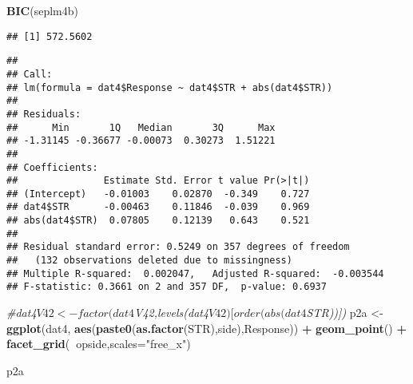 \documentclass[
]{article}
\newenvironment{Shaded}{\begin{snugshade}}{\end{snugshade}}
\newcommand{\CommentTok}[1]{\textcolor[rgb]{0.56,0.35,0.01}{\textit{#1}}}
\newcommand{\DataTypeTok}[1]{\textcolor[rgb]{0.13,0.29,0.53}{#1}}
\newcommand{\KeywordTok}[1]{\textcolor[rgb]{0.13,0.29,0.53}{\textbf{#1}}}
\newcommand{\NormalTok}[1]{#1}
\newcommand{\OperatorTok}[1]{\textcolor[rgb]{0.81,0.36,0.00}{\textbf{#1}}}
\newcommand{\StringTok}[1]{\textcolor[rgb]{0.31,0.60,0.02}{#1}}
\begin{document}
\begin{Shaded}
\begin{Highlighting}[]
\KeywordTok{BIC}\NormalTok{(seplm4b)}
\end{Highlighting}
\end{Shaded}

\begin{verbatim}
## [1] 572.5602
\end{verbatim}

\begin{Shaded}
\end{Shaded}

\begin{verbatim}
## 
## Call:
## lm(formula = dat4$Response ~ dat4$STR + abs(dat4$STR))
## 
## Residuals:
##      Min       1Q   Median       3Q      Max 
## -1.31145 -0.36677 -0.00073  0.30273  1.51221 
## 
## Coefficients:
##               Estimate Std. Error t value Pr(>|t|)
## (Intercept)   -0.01003    0.02870  -0.349    0.727
## dat4$STR      -0.00463    0.11846  -0.039    0.969
## abs(dat4$STR)  0.07805    0.12139   0.643    0.521
## 
## Residual standard error: 0.5249 on 357 degrees of freedom
##   (132 observations deleted due to missingness)
## Multiple R-squared:  0.002047,   Adjusted R-squared:  -0.003544 
## F-statistic: 0.3661 on 2 and 357 DF,  p-value: 0.6937
\end{verbatim}

\begin{Shaded}
\begin{Highlighting}[]
\CommentTok{#dat4$V42 <- factor(dat4$V42,levels(dat4$V42)[order(abs(dat4$STR))])}
\NormalTok{p2a <-}\StringTok{ }\KeywordTok{ggplot}\NormalTok{(dat4, }\KeywordTok{aes}\NormalTok{(}\KeywordTok{paste0}\NormalTok{(}\KeywordTok{as.factor}\NormalTok{(STR),side),Response)) }\OperatorTok{+}\StringTok{ }\KeywordTok{geom_point}\NormalTok{() }\OperatorTok{+}\StringTok{ }\KeywordTok{facet_grid}\NormalTok{(}\OperatorTok{~}\NormalTok{opside,}\DataTypeTok{scales=}\StringTok{"free_x"}\NormalTok{)}

\NormalTok{p2a}
\end{Highlighting}
\end{Shaded}
\end{document}
